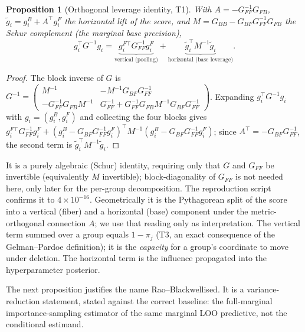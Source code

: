 \documentclass[11pt]{article}
\newtheorem{proposition}{Proposition}
\newcommand{\GFF}{G_{FF}}
\newcommand{\GBB}{G_{BB}}
\newcommand{\GBF}{G_{BF}}
\begin{document}
\begin{proposition}[Orthogonal leverage identity, T1]\label{thm:t1}
With $A = -\GFF^{-1} G_{FB}$, $\tilde g_i = g_i^B + A^\top g_i^F$ the horizontal
lift of the score, and $M = \GBB - \GBF \GFF^{-1} G_{FB}$ the Schur complement (the
marginal base precision),
\[
g_i^\top G^{-1} g_i
= \underbrace{g_i^{F\top}\GFF^{-1} g_i^F}_{\text{vertical (pooling)}}
+ \underbrace{\tilde g_i^\top M^{-1}\tilde g_i}_{\text{horizontal (base leverage)}}.
\]
\end{proposition}
\begin{proof}
The block inverse of $G$ is
$G^{-1} = \left(\begin{smallmatrix} M^{-1} & -M^{-1}\GBF\GFF^{-1}\\ -\GFF^{-1}G_{FB}M^{-1} & \GFF^{-1}+\GFF^{-1}G_{FB}M^{-1}\GBF\GFF^{-1}\end{smallmatrix}\right)$.
Expanding $g_i^\top G^{-1} g_i$ with $g_i=(g_i^B,g_i^F)$ and collecting the four
blocks gives $g_i^{F\top}\GFF^{-1}g_i^F + (g_i^B-\GBF\GFF^{-1}g_i^F)^\top M^{-1}(g_i^B-\GBF\GFF^{-1}g_i^F)$;
since $A^\top = -\GBF\GFF^{-1}$, the second term is $\tilde g_i^\top M^{-1}\tilde g_i$.
\end{proof}
It is a purely algebraic (Schur) identity, requiring only that $G$ and $G_{FF}$ be
invertible (equivalently $M$ invertible); block-diagonality of $G_{FF}$ is not
needed here, only later for the per-group decomposition. The reproduction script
confirms it to $4\times10^{-16}$. Geometrically it is the Pythagorean split of the
score into a vertical (fiber) and a horizontal (base) component under the
metric-orthogonal connection $A$; we use that reading only as interpretation. The vertical term summed over a group equals
$1-\pi_j$ (T3, an exact consequence of the Gelman--Pardoe definition); it is the
\emph{capacity} for a group's coordinate to move under deletion. The horizontal term
is the influence propagated into the hyperparameter posterior.

The next proposition justifies the name Rao--Blackwellised. It is a
variance-reduction statement, stated against the correct baseline: the full-marginal
importance-sampling estimator of the same marginal LOO predictive, not the
conditional estimand.
\end{document}
